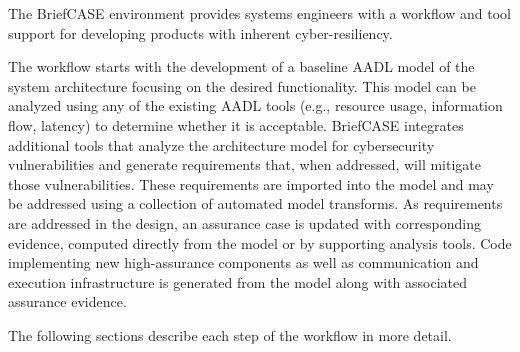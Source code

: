 

The BriefCASE environment provides systems engineers with a workflow and tool support for developing
products with inherent cyber-resiliency. 

The  workflow starts with the development of a baseline AADL model of the system architecture
focusing on the desired functionality. This model can be analyzed using any of the existing AADL 
tools (e.g., resource usage, information flow, latency) to determine whether it is acceptable.
BriefCASE integrates additional tools that analyze the architecture model for cybersecurity vulnerabilities and
generate requirements that, when addressed, will mitigate those vulnerabilities.
These requirements are imported into the model and may be addressed using a 
collection of automated model transforms. As requirements are addressed in the design, an assurance case is updated with
corresponding evidence, computed directly from the model or by supporting analysis tools.  
Code implementing new high-assurance components as well as communication and execution infrastructure
is generated from the model along with associated assurance evidence.  

The following sections describe each step of the workflow in more detail. 

